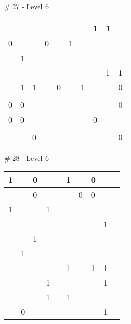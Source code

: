 \medskip

\# 27 - Level 6 \newline
\begin{tabular}{|m{\collen}|m{\collen}|m{\collen}|m{\collen}|m{\collen}|m{\collen}|m{\collen}|m{\collen}|m{\collen}|m{\collen}|}
\hline
    &   &   &   &   &   &   & 1 & 1 &   \\
\hline
  0 &   &   & 0 &   & 1 &   &   &   &   \\
\hline
    & 1 &   &   &   &   &   &   &   &   \\
\hline
    &   &   &   &   &   &   &   & 1 & 1 \\
\hline
    & 1 & 1 &   & 0 &   & 1 &   &   & 0 \\
\hline
    &   &   &   &   &   &   &   &   &   \\
\hline
  0 & 0 &   &   &   &   &   &   &   & 0 \\
\hline
  0 & 0 &   &   &   &   &   & 0 &   &   \\
\hline
    &   &   &   &   &   &   &   &   &   \\
\hline
    &   & 0 &   &   &   &   &   &   & 0 \\
\hline
\end{tabular}


\medskip

\# 28 - Level 6 \newline
\begin{tabular}{|m{\collen}|m{\collen}|m{\collen}|m{\collen}|m{\collen}|m{\collen}|m{\collen}|m{\collen}|m{\collen}|m{\collen}|}
\hline
  1 &   & 0 &   &   & 1 &   & 0 &   &   \\
\hline
    &   & 0 &   &   &   & 0 & 0 &   &   \\
\hline
  1 &   &   & 1 &   &   &   &   &   &   \\
\hline
    &   &   &   &   &   &   &   & 1 &   \\
\hline
    &   & 1 &   &   &   &   &   &   &   \\
\hline
    & 1 &   &   &   &   &   &   &   &   \\
\hline
    &   &   &   &   & 1 &   & 1 & 1 &   \\
\hline
    &   &   & 1 &   &   &   &   & 1 &   \\
\hline
    &   &   & 1 &   & 1 &   &   &   &   \\
\hline
    & 0 &   &   &   &   &   &   & 1 &   \\
\hline
\end{tabular}


\medskip

